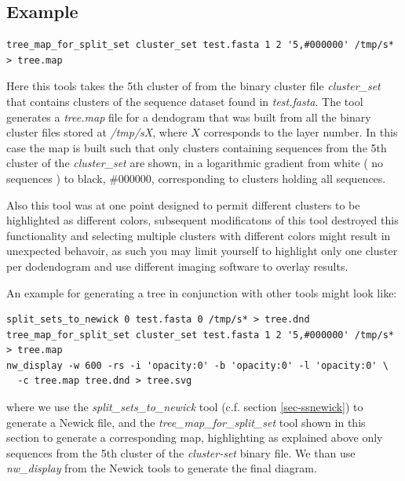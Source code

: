
\subsection{Example}
\begin{lstlisting}
tree_map_for_split_set cluster_set test.fasta 1 2 '5,#000000' /tmp/s* > tree.map
\end{lstlisting}
Here this tools takes the 5th cluster of from the binary cluster file
\emph{cluster\_set} that contains clusters of the sequence dataset
found in \emph{test.fasta}. The tool generates a \emph{tree.map} file
for a dendogram that was built from all the binary cluster files
stored at \emph{/tmp/sX}, where $X$ corresponds to the layer
number. In this case the map is built such that only clusters
containing sequences from the 5th cluster of the \emph{cluster\_set}
are shown, in a logarithmic gradient from white ( no sequences ) to
black, \#000000, corresponding to clusters holding all sequences.

Also this tool was at one point designed to permit different clusters
to be highlighted as different colors, subsequent modificatons of this
tool destroyed this functionality and selecting multiple clusters with
different colors might result in unexpected behavoir, as such you may
limit yourself to highlight only one cluster per dodendogram and use
different imaging software to overlay results.

An example for generating a tree in conjunction with other tools might
look like:
\begin{lstlisting}
split_sets_to_newick 0 test.fasta 0 /tmp/s* > tree.dnd
tree_map_for_split_set cluster_set test.fasta 1 2 '5,#000000' /tmp/s* > tree.map
nw_display -w 600 -rs -i 'opacity:0' -b 'opacity:0' -l 'opacity:0' \
  -c tree.map tree.dnd > tree.svg
\end{lstlisting}
where we use the \emph{split\_sets\_to\_newick} tool (c.f. section
\ref{sec-ssnewick}) to generate a
Newick file, and the \emph{tree\_map\_for\_split\_set} tool shown in
this section to generate a corresponding map, highlighting as
explained above only sequences from the 5th cluster of the
\emph{cluster-set} binary file. We than use \emph{nw\_display} from
the Newick tools \cite{newick_tools} to generate the final diagram.

